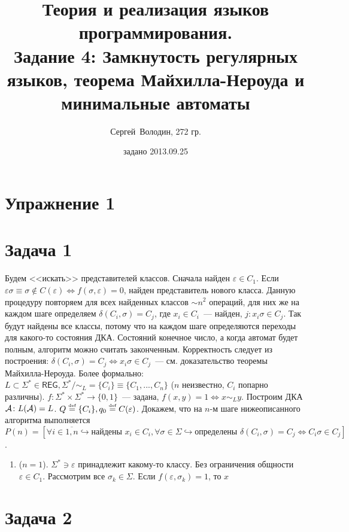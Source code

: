 \documentclass[a4paper]{article}
\title{Теория и реализация языков программирования.\\Задание 4: Замкнутость регулярных языков, теорема Майхилла-Нероуда и минимальные автоматы}
\date{задано 2013.09.25}
\author{Сергей~Володин, 272 гр.}
\def\A{{\cal A}}
\def\REG{{\mathsf{REG}}}
\begin{document}
\maketitle
\section*{Упражнение 1}
\section*{Задача 1}
Будем <<искать>> представителей классов. Сначала найден $\varepsilon\in C_1$. Если $\varepsilon\sigma\equiv\sigma\notin C(\varepsilon)\Leftrightarrow f(\sigma,\varepsilon)=0$, найден представитель нового класса. Данную процедуру повторяем для всех найденных классов $\sim n^2$ операций, для них же на каждом шаге определяем $\delta(C_i,\sigma)=C_j$, где $x_i\in C_i$~--- найден, $j\colon x_i\sigma\in C_j$. Так будут найдены все классы, потому что на каждом шаге определяются переходы для какого-то состояния ДКА. Состояний конечное число, а когда автомат будет полным, алгоритм можно считать законченным. Корректность следует из построения: $\delta(C_i,\sigma)=C_j\Leftrightarrow x_i\sigma\in C_j$~--- см. доказательство теоремы Майхилла-Нероуда.\newline
Более формально: $L\subset\Sigma^*\in\REG,\Sigma^*/\sim_L=\{C_i\}\equiv\{C_1,...,C_n\}$ ($n$ неизвестно, $C_i$ попарно различны). $f\colon \Sigma^*\times\Sigma^*\longrightarrow\{0,1\}$~--- задана, $f(x,y)=1\Leftrightarrow x\sim_Ly$.
Построим ДКА $\A\colon L(\A)=L$.\newline
$Q\overset{\mbox{\tiny def}}{=}\{C_i\}, q_0\overset{\mbox{\tiny def}}{=}C(\varepsilon)$. Докажем, что на $n$-м шаге нижеописанного алгоритма выполняется\newline
$P(n)=[\forall i\in\overline{1,n}\hookrightarrow \mbox{найдены }x_i\in C_i, \forall\sigma\in\Sigma\hookrightarrow\mbox{определены }\delta(C_i,\sigma)=C_j\Leftrightarrow C_i\sigma\in C_j]$.
\begin{enumerate}
\item ($n=1$). $\Sigma^*\ni\varepsilon$ принадлежит какому-то классу. Без ограничения общности $\varepsilon\in C_1$. Рассмотрим все $\sigma_k\in\Sigma$. Если $f(\varepsilon,\sigma_k)=1$, то $x$
\end{enumerate}
\section*{Задача 2}
\end{document}
